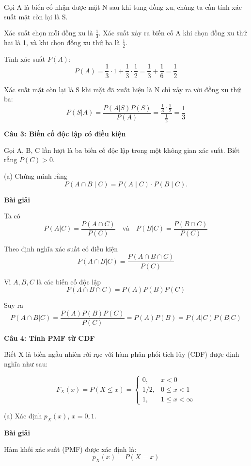 \documentclass[10pt,a4paper]{article}
\begin{document}
Gọi A là biến cố nhận được mặt N sau khi tung đồng xu, chúng ta cần tính xác suất mặt còn lại là S.

Xác suất chọn mỗi đồng xu là \( \frac{1}{3} \). Xác suất xảy ra biến cố A khi chọn đồng xu thứ hai là 1, và khi chọn đồng xu thứ ba là \( \frac{1}{2} \). 

Tính xác suất \( P(A) \):
\[
P(A) = \frac{1}{3} \cdot 1 + \frac{1}{3} \cdot \frac{1}{2} = \frac{1}{3} + \frac{1}{6} = \frac{1}{2}
\]

Xác suất mặt còn lại là S khi mặt đã xuất hiện là N chỉ xảy ra với đồng xu thứ ba:
\[
P(S | A) = \frac{P(A | S) P(S)}{P(A)} = \frac{\frac{1}{3} \cdot \frac{1}{2}}{\frac{1}{2}} = \frac{1}{3}
\]

\textbf{Câu 3: Biến cố độc lập có điều kiện}

Gọi A, B, C lần lượt là ba biến cố độc lập trong một không gian xác suất. Biết rằng \( P(C) > 0 \).

(a) Chứng minh rằng 
\[
P(A \cap B \mid C) = P(A \mid C) \cdot P(B \mid C).
\]

\textbf{Bài giải}


Ta có
\[
P(A | C) = \frac{P(A \cap C)}{P(C)} \quad \text{và} \quad P(B | C) = \frac{P(B \cap C)}{P(C)}
\]

Theo định nghĩa xác suất có điều kiện
\[
P(A \cap B | C) = \frac{P(A \cap B \cap C)}{P(C)}
\]

Vì \(A, B, C\) là các biến cố độc lập
\[
P(A \cap B \cap C) = P(A) P(B) P(C)
\]



Suy ra
\[
P(A \cap B | C) = \frac{P(A) P(B) P(C)}{P(C)} = P(A) P(B) = P(A | C) P(B | C)
\]



\textbf{Câu 4: Tính PMF từ CDF}


Biết X là biến ngẫu nhiên rời rạc với hàm phân phối tích lũy (CDF) được định nghĩa như sau:

\[
F_X(x) = P(X \leq x) = 
\begin{cases} 
	0, & x < 0 \\
	1/2, & 0 \leq x < 1 \\
	1, & 1 \leq x < \infty 
\end{cases}
\]


(a) Xác định \( p_X(x) \), \( x = 0, 1 \).


\textbf{Bài giải}




Hàm khối xác suất (PMF) được xác định là:
\[
p_X(x) = P(X = x)
\]
\end{document}
